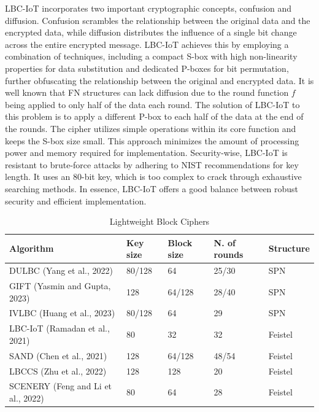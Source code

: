 \documentclass[conference]{IEEEtran}
\begin{document}
LBC-IoT incorporates two important cryptographic concepts, confusion and diffusion. Confusion scrambles the relationship between the original data and the encrypted data, while diffusion distributes the influence of a single bit change across the entire encrypted message. LBC-IoT achieves this by employing a combination of techniques, including a compact S-box with high non-linearity properties for data substitution and dedicated P-boxes for bit permutation, further obfuscating the relationship between the original and encrypted data. It is well known that FN structures can lack diffusion due to the round function $f$ being applied to only half of the data each round. The solution of LBC-IoT to this problem is to apply a different P-box to each half of the data at the end of the rounds. The cipher utilizes simple operations within its core function and keeps the S-box size small. This approach minimizes the amount of processing power and memory required for implementation. Security-wise, LBC-IoT is resistant to brute-force attacks by adhering to NIST recommendations for key length. It uses an 80-bit key, which is too complex to crack through exhaustive searching methods. In essence, LBC-IoT offers a good balance between robust security and efficient implementation\cite{LBC-IoT}.

\begin{table}[ht]
    \centering
    \caption{Lightweight Block Ciphers}
    \begin{tabular}{lllll} 
     \toprule
     Algorithm & Key size & Block size & N. of rounds & Structure \\ 
     \midrule
     DULBC (Yang et al., 2022) \cite{DULBC} & 80/128 & 64 & 25/30 & SPN \\
     GIFT (Yasmin and Gupta, 2023)\cite{GIFT}\cite{yasmin2023modified} & 128 & 64/128 & 28/40 & SPN \\
     IVLBC (Huang et al., 2023)\cite{IVLBC} & 80/128 & 64 & 29 & SPN \\
     LBC-IoT (Ramadan et al., 2021)\cite{LBC-IoT} & 80 & 32 & 32 & Feistel  \\
     SAND (Chen et al., 2021)\cite{SAND} & 128 & 64/128 & 48/54 & Feistel \\
     LBCCS (Zhu et al., 2022)\cite{LBCCS} & 128 & 128 & 20 & Feistel \\
     SCENERY (Feng and Li et al., 2022)\cite{SCENERY} & 80 & 64 & 28 & Feistel  \\
     \bottomrule
    \end{tabular}
    \label{table:ciphers}
\end{table}
\end{document}
